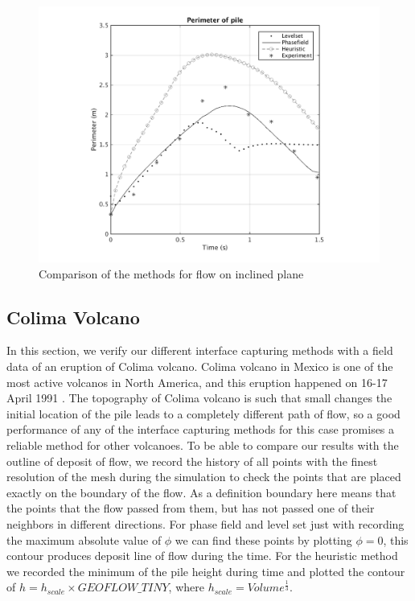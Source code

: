 \documentclass[letterpaper,10pt]{article}
\begin{document}
\begin{figure}[H]
\begin{minipage}[b]{.48 \linewidth}
		\includegraphics[scale=0.48]{IMAGES/perimeter.png}
	\end{minipage}
	\caption{Comparison of the methods for flow on inclined plane}
	\label{compinc}
\end{figure}

\subsection{Colima Volcano}
In this section, we verify our different interface capturing methods with a field data of an eruption of Colima volcano. 
Colima volcano in Mexico is one of the most active volcanos in North America, and this eruption happened on 16-17 April 1991 \cite{Charbonnier2008}. 
The topography of Colima volcano is such that small changes the initial location of the pile leads to a completely different 
path of flow, so a good performance of any of the interface capturing methods for this case promises a reliable method for other volcanoes.
To be able to compare our results with the outline of deposit of flow, we record the history of all points with the finest 
resolution of the mesh during the simulation to check the points that are placed exactly on the boundary of the flow. 
As a definition boundary here means that the points that the flow passed from them, but has not passed one of their neighbors 
in different directions. For phase field and level set just with recording the maximum absolute value of $ \phi $ we can find 
these points by plotting $\phi=0$, this contour produces deposit line of flow during the time. For the heuristic method we 
recorded the minimum of the pile height during time and plotted the contour of $ h = h_{scale} \times GEOFLOW \_ TINY$, where 
$ h_{scale} =Volume^\frac{1}{3} $.
\end{document}
